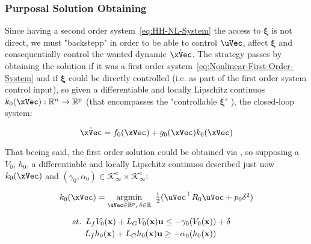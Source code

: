 \subsubsection{Purposal Solution Obtaining}
\label{subsub:quadratic_program_formulation}

Since having a second order system~\ref{eq:HH-NL-System} the access to \(\mathbf{\xi}\) is not direct, we must "backstepp" in order to be able to control \(\uVec\), affect \(\mathbf{\xi}\) and consequentially control the wanted dynamic \(\dot{\xVec}\). The strategy passes by obtaining the solution if it was a first order system~\ref{eq:Nonlinear-First-Order-System} and if \(\mathbf{\xi}\) could be directly controlled (i.e. as part of the first order system control input), so given a differentiable and locally Lipschitz continuos \(k_0(\xVec):\mathbb{R}^n \to \mathbb{R}^p\) (that encompasses the "controllable \(\mathbf{\xi}\)" ), the closed-loop system:

\begin{equation}
    \dot{\xVec} = f_0(\xVec) + g_0(\xVec) k_0(\xVec)\\ 
 \label{eq:NL-CL-System-0Backstep}
\end{equation}

That beeing said, the first order solution could be obtained via , so supposing a  \(V_0\),   \(h_0\),  a differentiable and locally Lipschitz continuos described just now \(k_0(\xVec)\) and \((\gamma_0, \alpha_0) \in \mathcal{K}^e_\infty \times \mathcal{K}^e_\infty\):

\begin{equation}
    \begin{array}{l}
        k_0(\xVec) = \underset{\uVec \in \mathbb{R}^p, \hspace{0.2em} \delta \in \mathbb{R}}{\mathrm{argmin}} \quad \hspace{-0.5em} \frac{1}{2} (\uVec^\top R_0 \uVec + p_0\delta^2 ) \vspace{1em} \\ 
        \quad \hspace{0.5em}  st. \hspace{0.5em} L_fV_0(\mathbf{x}) + L_GV_0(\mathbf{x})\mathbf{u} \leq -\gamma_0(V_0(\mathbf{x})) + \delta \vspace{0.25em}\\
        \quad \quad \hspace{1em} L_fh_0(\mathbf{x}) + L_Gh_0(\mathbf{x})\mathbf{u} \geq -\alpha_0(h_0(\mathbf{x}))
    \end{array}
 \label{eq:CLF-CBF-QP-relaxed-0Backstep}
\end{equation}


